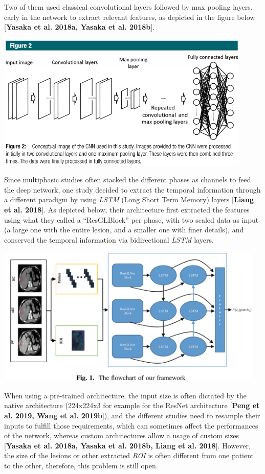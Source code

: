 \documentclass[]{article}
\begin{document}
Two of them used classical convolutional layers followed by max pooling
layers, early in the network to extract relevant features, as depicted
in the figure below {[}\textbf{Yasaka et al. 2018a, Yasaka et al.
2018b}{]}.

\includegraphics[width=4.77665in,height=2.57082in]{./images/image10.png}

Since multiphasic studies often stacked the different phases as channels
to feed the deep network, one study decided to extract the temporal
information through a different paradigm by using \emph{LSTM} (Long
Short Term Memory) layers {[}\textbf{Liang et al. 2018}{]}. As depicted
below, their architecture first extracted the features using what they
called a ``ResGLBlock'' per phase, with two scaled data as input (a
large one with the entire lesion, and a smaller one with finer details),
and conserved the temporal information via bidirectional \emph{LSTM}
layers.

\includegraphics[width=5.07513in,height=2.63463in]{./images/image7.png}

When using a pre-trained architecture, the input size is often dictated
by the native architecture (224x224x3 for example for the ResNet
architecture {[}\textbf{Peng et al. 2019, Wang et al. 2019b}{]}), and
the different studies need to resample their inputs to fulfill those
requirements, which can sometimes affect the performances of the
network, whereas custom architectures allow a usage of custom sizes
{[}\textbf{Yasaka et al. 2018a, Yasaka et al. 2018b, Liang et al.
2018}{]}. However, the size of the lesions or other extracted \emph{ROI}
is often different from one patient to the other, therefore, this
problem is still open.
\end{document}
